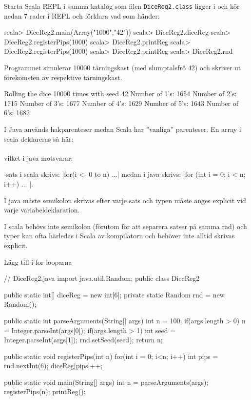 \Subtask Starta Scala REPL i samma katalog som filen \texttt{DiceReg2.class} ligger i och kör nedan 7 rader i REPL och förklara vad som händer:
\begin{REPL}
scala> DiceReg2.main(Array("1000","42"))
scala> DiceReg2.diceReg
scala> DiceReg2.registerPips(1000)
scala> DiceReg2.printReg
scala> DiceReg2.registerPips(1000)
scala> DiceReg2.printReg
scala> DiceReg2.rnd
\end{REPL}

\SOLUTION

\TaskSolved \what

\SubtaskSolved Programmet simulerar 10000 tärningskast (med slumptalsfrö 42) och skriver ut förekomsten av respektive tärningskast.

\begin{REPL}
Rolling the dice 10000 times with seed 42
Number of 1's: 1654
Number of 2's: 1715
Number of 3's: 1677
Number of 4's: 1629
Number of 5's: 1643
Number of 6's: 1682
\end{REPL}

\SubtaskSolved  I Java används hakparenteser medan Scala har ''vanliga'' parenteser. En array i scala deklareras så här: \\
  \\
 vilket i java motsvarar: 

-sats i scala skrivs: \code|for(i <- 0 to n) {...}| medan i java skrivs: \code|for (int i = 0; i < n; i++) { ... }|.

I java måste semikolon skrivas efter varje sats och typen måste anges explicit vid varje variabeldeklaration.

I scala behövs inte semikolon (förutom för att separera satser på samma rad) och typer kan ofta härledas i Scala av kompilatorn och behöver inte alltid skrivas explicit.

\SubtaskSolved  Lägg till  i for-looparna

\SubtaskSolved  \begin{Code}[language=Java]
// DiceReg2.java
import java.util.Random;
public class DiceReg2{
	public static int[] diceReg = new int[6];
	private static Random rnd = new Random();

	public static int parseArguments(String[] args){
		int n = 100;
		if(args.length > 0) {
			n = Integer.parseInt(args[0]);
		}
		if(args.length > 1) {
			int seed = Integer.parseInt(args[1]);
			rnd.setSeed(seed);
		}
		return n;
	}

	public static void registerPips(int n) {
		for(int i = 0; i<n; i++) {
			int pips = rnd.nextInt(6);
			diceReg[pips]++;
		}
	}

	public static void main(String[] args) {
		int n = parseArguments(args);
		registerPips(n);
		printReg();
	}
}
\end{Code}

